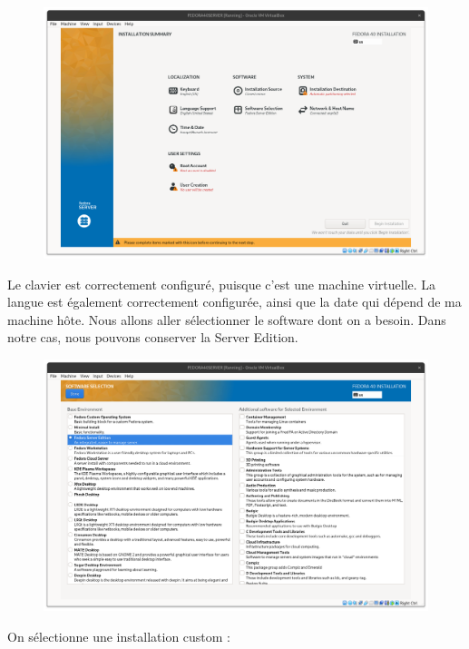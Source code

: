 \documentclass{article}
\begin{document}
\begin{figure}[h!]
		\centering
		\includegraphics[width=1\textwidth]{vbox7.png}
\end{figure}

Le clavier est correctement configuré, puisque c'est une machine virtuelle.
La langue est également correctement configurée, ainsi que la date qui dépend de ma machine hôte.
Nous allons aller sélectionner le software dont on a besoin.
Dans notre cas, nous pouvons conserver la Server Edition.

\begin{figure}[h!]
		\centering
		\includegraphics[width=1\textwidth]{vbox8.png}
\end{figure}
\pagebreak

On sélectionne une installation custom :
\end{document}
